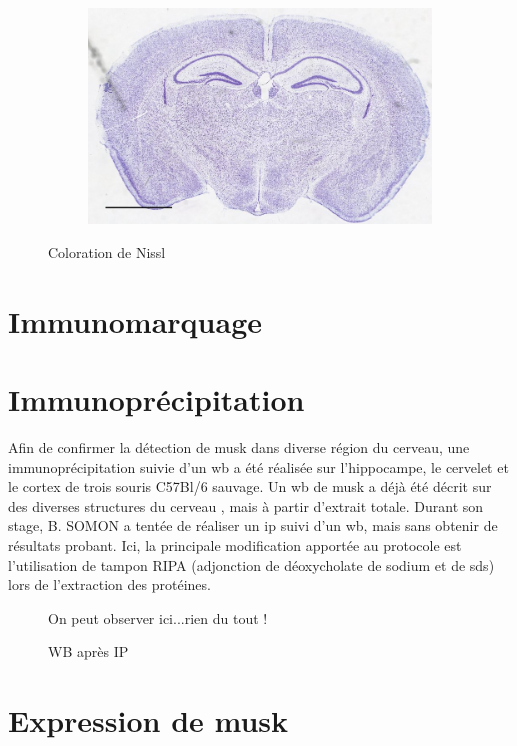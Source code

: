 \begin{figure}[h]
\begin{center}
\begin{subfigure}[h]{0.49\textwidth}
		\end{subfigure}
		\begin{subfigure}[h]{0.49\textwidth}%
			\caption{}
			\label{fig:MaleMutNissl}
			\includegraphics[width=\textwidth]{./Images/Nissl/MaleMut.jpg}
		\end{subfigure}
	\end{center}
	\caption{Coloration de Nissl}
	\label{fig:NisslResultat}
\end{figure}

\section{Immunomarquage}

\section{Immunoprécipitation}
\label{sec:IPresultat}
Afin de confirmer la détection de \gls{musk} dans diverse région du cerveau, une immunoprécipitation suivie d'un \gls{wb} a été réalisée sur l'hippocampe, le cervelet et le cortex de trois souris C57Bl/6 sauvage. Un \gls{wb} de \gls{musk} a déjà été décrit sur des diverses structures du cerveau \cite{Garcia-Osta2006}, mais à partir d'extrait totale. Durant son stage, B. SOMON a tentée de réaliser un \gls{ip} suivi d'un \gls{wb}, mais sans obtenir de résultats probant. Ici, la principale modification apportée au protocole est l'utilisation de tampon RIPA (adjonction de déoxycholate de sodium et de \acrshort{sds}) lors de l'extraction des protéines.

\begin{figure}[h]
	\caption{WB après IP}{On peut observer ici...rien du tout !}
	\label{fig:WBMuSK}
\end{figure}

\section{Expression de \gls{musk}}